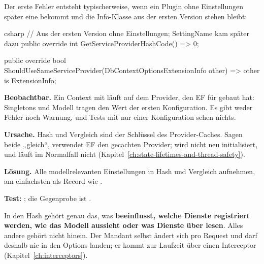 Der erste Fehler entsteht typischerweise, wenn ein Plugin ohne Einstellungen später eine
bekommt und die Info-Klasse aus der ersten Version stehen bleibt:

\begin{sourcecode}{csharp}
// Aus der ersten Version ohne Einstellungen; SettingName kam später dazu
public override int GetServiceProviderHashCode() => 0;

public override bool ShouldUseSameServiceProvider(DbContextOptionsExtensionInfo other)
    => other is ExtensionInfo;
\end{sourcecode}

\begin{failure}
  \textbf{Beobachtbar.} Ein Context mit  läuft auf dem Provider,
  den EF für  gebaut hat: Singletons und Modell tragen den Wert der
  ersten Konfiguration. Es gibt weder Fehler noch Warnung, und Tests mit nur einer
  Konfiguration sehen nichts.

  \textbf{Ursache.} Hash und Vergleich sind der Schlüssel des Provider-Caches. Sagen beide
  „gleich“, verwendet EF den gecachten Provider; 
  wird nicht neu initialisiert, und  läuft im Normalfall nicht
  (Kapitel~\ref{ch:state-lifetimes-and-thread-safety}).

  \textbf{Lösung.} Alle modellrelevanten Einstellungen in Hash und Vergleich aufnehmen, am
  einfachsten als Record wie .

  \textbf{Test:}
  ;
  die Gegenprobe ist
  .
\end{failure}

\begin{important}
  In den Hash gehört genau das, was \textbf{beeinflusst, welche Dienste registriert werden,
  wie das Modell aussieht oder was Dienste über 
  lesen}. Alles andere gehört nicht hinein. Der Mandant selbst ändert
  sich pro Request und darf deshalb nie in den Options landen; er kommt zur Laufzeit über
  einen Interceptor (Kapitel~\ref{ch:interceptors}).
\end{important}

